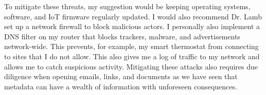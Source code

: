 \documentclass[12pt]{article}
\begin{document}
To mitigate these threats, my suggestion would be keeping operating systems, software, and IoT firmware regularly updated. I would also recommend Dr. Lamb set up a network firewall to block malicious actors. I personally also implement a DNS filter on my router that blocks trackers, malware, and advertisements network-wide. This prevents, for example, my smart thermostat from connecting to sites that I do not allow. This also gives me a log of traffic to my network and allows me to catch suspicious activity. Mitigating these attacks also requires due diligence when opening emails, links, and documents as we have seen that metadata can have a wealth of information with unforeseen consequences.




\end{document}
